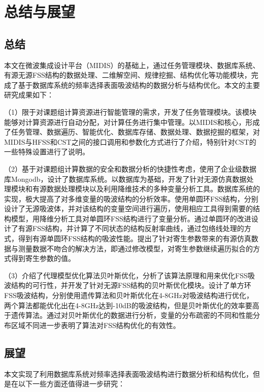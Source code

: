 \newpage

\section{总结与展望}

\subsection{总结}

本文在微波集成设计平台（MIDIS）的基础上，通过任务管理模块、数据库系统、有源无源FSS结构的数据处理、二维解空间、规律挖掘、结构优化等功能模块，完成了基于数据库系统的频率选择表面吸波结构的数据分析与结构优化。本文的主要研究成果如下：

（1）限于对课题组计算资源进行智能管理的需求，开发了任务管理模块。该模块能够对计算资源进行自动分配，对计算任务进行集中管理。以MIDIS和核心，形成了任务管理、数据遍历、智能优化、数据库存储、数据处理、数据挖掘的框架，对MIDIS与HFSS和CST之间的接口调用和参数化方式进行了介绍，特别针对CST的一些特殊设置进行了说明。

（2）基于对课题组计算数据的安全和数据分析的快捷性考虑，使用了企业级数据库Mongodb，设计了数据库系统。以数据库为基础，开发了针对无源仿真数据处理模块和有源数据处理模块以及利用降维技术的多种变量分析工具。数据库系统的实现，极大提高了对多维变量的吸波结构的分析效率。使用单圆环FSS结构，分别设计了无源吸波体，并对该结构的变量空间进行遍历，使用相应工具得到需要的结构模型，用降维分析工具对单圆环FSS结构进行了变量分析。通过单圆环的改进设计了有源FSS结构，并计算了不同状态的结构反射率曲线，通过包络线处理的方式，得到有源单圆环FSS结构的吸波性能。提出了针对寄生参数带来的有源仿真数据与测量数据不吻合的解决方法，即通过修改模型，对寄生参数继续遍历拟合的方式得到寄生参数的值。

（3）介绍了代理模型优化算法贝叶斯优化，分析了该算法原理和用来优化FSS吸波结构的可行性，并开发了针对无源FSS结构的贝叶斯优化模块。设计了单方环FSS吸波结构，分别使用遗传算法和贝叶斯优化在4-8GHz对吸波结构进行优化，两个算法都能优化出在4-8GHz达到-10dB的吸波结构，但是贝叶斯优化的效率要高于遗传算法。通过对贝叶斯优化的数据进行分析，变量的分布疏密的不同和性能分布区域不同进一步表明了算法对FSS结构优化的有效性。

\subsection{展望}

本文实现了利用数据库系统对频率选择表面吸波结构进行数据分析和结构优化，但是在以下一些方面还值得进一步研究：

